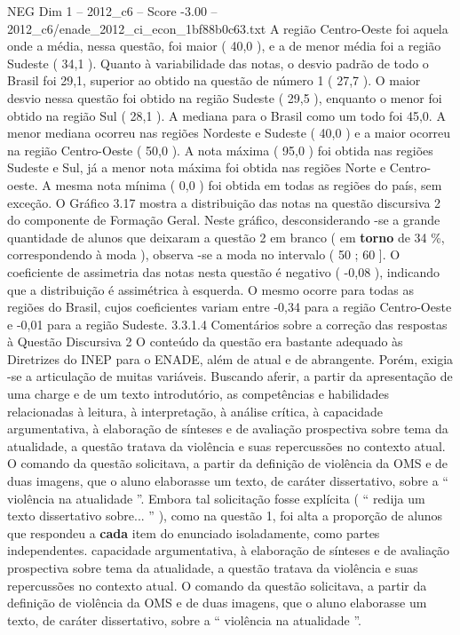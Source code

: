 \begin{textsample}{NEG Dim 1 – 2012\_c6 – Score -3.00 – 2012\_c6/enade\_2012\_ci\_econ\_1bf88b0c63.txt}
A região Centro-Oeste foi aquela onde a média, nessa questão, foi maior ( 40,0 ), e a de menor média foi a região Sudeste ( 34,1 ).
Quanto à variabilidade das notas, o desvio padrão de todo o Brasil foi 29,1, superior ao obtido na questão de número 1 ( 27,7 ).
O maior desvio nessa questão foi obtido na região Sudeste ( 29,5 ), enquanto o menor foi obtido na região Sul ( 28,1 ).
A mediana para o Brasil como um todo foi 45,0.
A menor mediana ocorreu nas regiões Nordeste e Sudeste ( 40,0 ) e a maior ocorreu na região Centro-Oeste ( 50,0 ).
A nota máxima ( 95,0 ) foi obtida nas regiões Sudeste e Sul, já a menor nota máxima foi obtida nas regiões Norte e Centro-oeste.
A mesma nota mínima ( 0,0 ) foi obtida em todas as regiões do país, sem exceção.
O Gráfico 3.17 mostra a distribuição das notas na questão discursiva 2 do componente de Formação Geral.
Neste gráfico, desconsiderando -se a grande quantidade de alunos que deixaram a questão 2 em branco ( em \textbf{torno} de 34 \%, correspondendo à moda ), observa -se a moda no intervalo ( 50 ; 60 ].
O coeficiente de assimetria das notas nesta questão é negativo ( -0,08 ), indicando que a distribuição é assimétrica à esquerda.
O mesmo ocorre para todas as regiões do Brasil, cujos coeficientes variam entre -0,34 para a região Centro-Oeste e -0,01 para a região Sudeste. 3.3.1.4 Comentários sobre a correção das respostas à Questão Discursiva 2 O conteúdo da questão era bastante adequado às Diretrizes do INEP para o ENADE, além de atual e de abrangente.
Porém, exigia -se a articulação de muitas variáveis.
Buscando aferir, a partir da apresentação de uma charge e de um texto introdutório, as competências e habilidades relacionadas à leitura, à interpretação, à análise crítica, à capacidade argumentativa, à elaboração de sínteses e de avaliação prospectiva sobre tema da atualidade, a questão tratava da violência e suas repercussões no contexto atual.
O comando da questão solicitava, a partir da definição de violência da OMS e de duas imagens, que o aluno elaborasse um texto, de caráter dissertativo, sobre a “ violência na atualidade ”.
Embora tal solicitação fosse explícita ( “ redija um texto dissertativo sobre... ” ), como na questão 1, foi alta a proporção de alunos que respondeu a \textbf{cada} item do enunciado isoladamente, como partes independentes. capacidade argumentativa, à elaboração de sínteses e de avaliação prospectiva sobre tema da atualidade, a questão tratava da violência e suas repercussões no contexto atual.
O comando da questão solicitava, a partir da definição de violência da OMS e de duas imagens, que o aluno elaborasse um texto, de caráter dissertativo, sobre a “ violência na atualidade ”.

\end{textsample}
